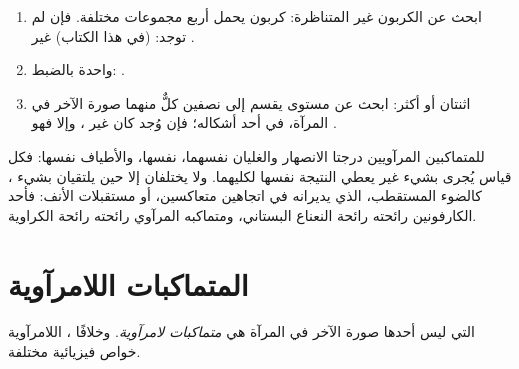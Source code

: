 \begin{method}\label{met:g12:stereochemistry:chiral}
\begin{enumerate}
  \item ابحث عن  الكربون غير المتناظرة: كربون يحمل أربع مجموعات
        مختلفة. فإن لم توجد:  (في هذا الكتاب) غير .
  \item واحدة بالضبط:  .
  \item اثنتان أو أكثر: ابحث عن مستوى يقسم  إلى نصفين
        كلٌّ منهما صورة الآخر في المرآة، في أحد أشكاله؛ فإن وُجد كان
         غير ، وإلا فهو .
\end{enumerate}
\end{method}

\begin{remark}\label{rem:g12:stereochemistry:same}
للمتماكبين المرآويين درجتا الانصهار والغليان نفسهما، 
نفسها، والأطياف نفسها: فكل قياس يُجرى بشيء
غير  يعطي النتيجة نفسها لكليهما. ولا يختلفان إلا
حين يلتقيان بشيء ، كالضوء المستقطب، الذي
يديرانه في اتجاهين متعاكسين، أو مستقبلات الأنف: فأحد الكارفونين
رائحته رائحة النعناع البستاني، ومتماكبه المرآوي رائحته رائحة الكراوية.
\end{remark}

\section{المتماكبات اللامرآوية}

\begin{definition}\label{def:g12:stereochemistry:diastereomer}
 التي ليس أحدها صورة الآخر في المرآة هي
\emph{متماكبات لامرآوية}. وخلافًا ،
 اللامرآوية خواص فيزيائية مختلفة.
\end{definition}

